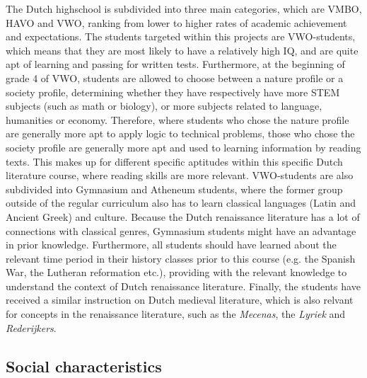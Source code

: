 The Dutch highschool is subdivided into three main categories, which are VMBO, HAVO and VWO, ranking from lower to higher rates of academic achievement and expectations. The students targeted within this projects are VWO-students, which means that they are most likely to have a relatively high IQ, and are quite apt of learning and passing for written tests. Furthermore, at the beginning of grade 4 of VWO, students are allowed to choose between a nature profile or a society profile, determining whether they have respectively have more STEM subjects (such as math or biology), or more subjects related to language, humanities or economy. Therefore, where students who chose the nature profile are generally more apt to apply logic to technical problems, those who chose the society profile are generally more apt and used to learning information by reading texts. This makes up for different specific aptitudes within this specific Dutch literature course, where reading skills are more relevant. VWO-students are also subdivided into Gymnasium and Atheneum students, where the former group outside of the regular curriculum also has to learn classical languages (Latin and Ancient Greek) and culture. Because the Dutch renaissance literature has a lot of connections with classical genres, Gymnasium students might have an advantage in prior knowledge. Furthermore, all students should have learned about the relevant time period in their history classes prior to this course (e.g. the Spanish War, the Lutheran reformation etc.), providing with the relevant knowledge to understand the context of Dutch renaissance literature. Finally, the students have received a similar instruction on Dutch medieval literature, which is also relvant for concepts in the renaissance literature, such as the \emph{Mecenas}, the \emph{Lyriek} and \emph{Rederijkers}.

\subsection{Social characteristics}

